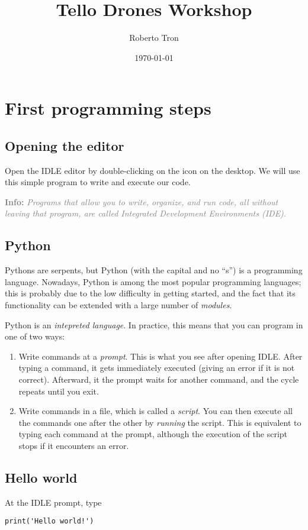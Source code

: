 \documentclass[12pt]{article}
\title{Tello Drones Workshop}
\author{Roberto Tron}
\date{\today}
\newcommand{\textsfbf}[1]{\textsf{\textbf{#1}}}
\newcommand{\info}[1]{\par\textcolor{gray}{\textsfbf{Info:} \emph{#1}}}
\begin{document}
\maketitle

\section{First programming steps}

\subsection{Opening the editor}
Open the IDLE editor by double-clicking on the icon on the desktop. We will use this simple program to write and execute our code.
\info{Programs that allow you to write, organize, and run code, all without leaving that program, are called Integrated Development Environments (IDE).}

\subsection{Python}
Pythons are serpents, but Python (with the capital and no ``s'') is a programming language. Nowadays, Python is among the most popular programming languages; this is probably due to the low difficulty in getting started, and the fact that its functionality can be extended with a large number of \emph{modules}.

Python is an \emph{intepreted language}. In practice, this means that you can program in one of two ways:
\begin{enumerate}
\item Write commands at a \emph{prompt}. This is what you see after opening IDLE. After typing a command, it gets immediately executed (giving an error if it is not correct). Afterward, it the prompt waits for another command, and the cycle repeats until you exit.
\item Write commands in a file, which is called a \emph{script}. You can then execute all the commands one after the other by \emph{running} the script. This is equivalent to typing each command at the prompt, although the execution of the script stops if it encounters an error.
\end{enumerate}

\subsection{Hello world}
At the IDLE prompt, type
\begin{lstlisting}
print('Hello world!')
\end{lstlisting}
\end{document}
